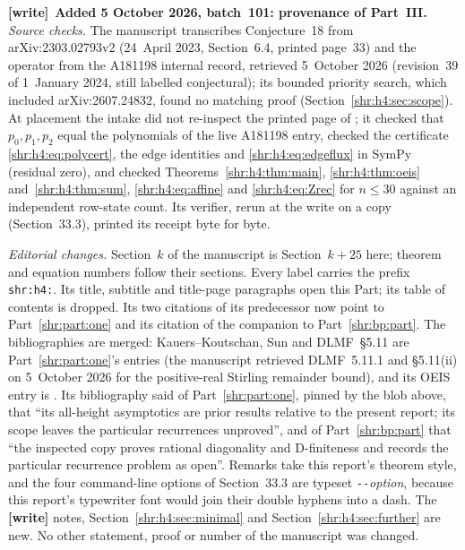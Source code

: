 \documentclass[11pt,letterpaper]{article}
\numberwithin{equation}{section}
\theoremstyle{definition}
\newcommand{\1}{\mathbf 1}
\newenvironment{writenote}[1][]{\par\smallskip\begingroup\small
 \noindent\textbf{[write]}\if\relax\detokenize{#1}\relax\else~\textbf{#1.}\fi\ }%
 {\par\endgroup\smallskip}
\begin{document}
\begin{writenote}[Added 5 October 2026, batch~101: provenance of Part~III]
\emph{Source checks.} The manuscript transcribes Conjecture~18 from
arXiv:2303.02793v2 (24~April 2023, Section~6.4, printed page~33) and the
operator from the A181198 internal record, retrieved 5~October 2026
(revision~39 of 1~January 2024, still labelled conjectural); its bounded
priority search, which included arXiv:2607.24832, found no matching proof
(Section~\ref{shr:h4:sec:scope}). At placement the intake did not
re-inspect the printed page of \cite{KK}; it checked that $p_0,p_1,p_2$
equal the polynomials of the live A181198 entry, checked the certificate
\eqref{shr:h4:eq:polycert}, the edge identities and \eqref{shr:h4:eq:edgeflux}
in SymPy (residual zero), and checked Theorems~\ref{shr:h4:thm:main},
\ref{shr:h4:thm:oeis} and~\ref{shr:h4:thm:sum}, \eqref{shr:h4:eq:affine}
and \eqref{shr:h4:eq:Zrec} for $n\le30$ against an independent row-state
count. Its verifier, rerun at the write on a copy (Section~33.3), printed
its receipt byte for byte.

\emph{Editorial changes.} Section~$k$ of the manuscript is
Section~$k+25$ here; theorem and equation numbers follow their sections.
Every label carries the prefix \texttt{shr:h4:}. Its title, subtitle and
title-page paragraphs open this Part; its table of contents is dropped. Its
two citations of its predecessor now point to Part~\ref{shr:part:one} and
its citation of the companion to Part~\ref{shr:bp:part}. The bibliographies
are merged: Kauers--Koutschan, Sun and DLMF~\S5.11 are
Part~\ref{shr:part:one}'s entries (the manuscript retrieved DLMF~5.11.1 and
\S5.11(ii) on 5~October 2026 for the positive-real Stirling remainder
bound), and its OEIS entry is \cite{oeis198int}. Its bibliography said of
Part~\ref{shr:part:one}, pinned by the blob above, that ``its all-height
asymptotics are prior results relative to the present report; its scope
leaves the particular recurrences unproved'', and of
Part~\ref{shr:bp:part} that ``the inspected copy proves rational
diagonality and D-finiteness and records the particular recurrence problem
as open''. Remarks take this report's theorem style, and the four
command-line options of Section~33.3 are typeset \texttt{-{}-}\emph{option},
because this report's typewriter font would join their double hyphens into
a dash. The \textbf{[write]}
notes, Section~\ref{shr:h4:sec:minimal} and
Section~\ref{shr:h4:sec:further} are new. No other statement, proof or
number of the manuscript was changed.
\end{writenote}
\end{document}
